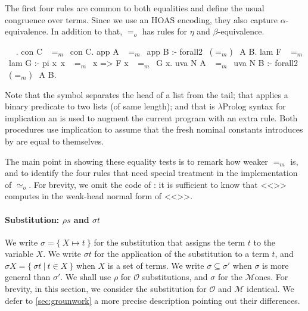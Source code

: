 \documentclass[sigconf,natbib=false,review]{acmart}
\newcommand{\EqualRel}{\ensuremath{=}}
\newcommand{\UnifRel}{\ensuremath{\simeq}}
\newcommand{\Uo}{\texorpdfstring{\ensuremath{\UnifRel_o}\xspace}{unif\_o}}
\newcommand{\Eo}{\ensuremath{\EqualRel_o}\xspace}
\newcommand{\Ee}{\ensuremath{\EqualRel_m}\xspace}
\newcommand{\Fo}{\texorpdfstring{\ensuremath{\mathcal{O}\xspace}}{O}} %
\newcommand{\Ho}{\texorpdfstring{\ensuremath{\mathcal{M}}\xspace}{M}}
\begin{document}
The first four rules are common to both equalities
and define the usual congruence over terms. Since
we use an HOAS encoding, they also capture $\alpha$-equivalence.
In addition to that, \Eo has rules for $\eta$ and $\beta$-equivalence.



\begin{elpicode}
  ~ \PYG{n+nf}{(\Ee)} ~.
  con C ~\Ee~con C.
  app A ~\Ee~app B :- forall2 ~(\Ee)~ A B.
  lam F ~\Ee~lam G :- pi x\ x ~\Ee~x => F x ~\Ee~G x.
  uva N A ~\Ee~uva N B :- forall2 ~(\Ee)~ A B.
\end{elpicode}

\noindent
Note that the symbol \elpiIn{|} separates the head of a list from the tail;
that  applies a binary predicate to two lists (of same
length); and that \elpiIn{=>} is $\lambda$Prolog syntax for
implication an is used to augment the
current program with an extra rule. Both procedures use implication to
assume that the fresh nominal constants introduces by  are
equal to themselves.

The main point in showing these equality tests is to remark how
weaker \Ee is, and to identify the four rules that need special
treatment in the implementation of \Uo.
For brevity, we omit the code of :
it is sufficient to know that <<>> computes in  the
weak-head normal form of <<>>.

\paragraph{Substitution: $\rho s$ and $\sigma t$}

We write $\sigma = \{~ X \mapsto t ~\}$ for the substitution that assigns
the term $t$ to the variable $X$.
We write $\sigma t$ for the application of
the substitution to a term $t$, and $\sigma X = \{~ \sigma t ~|~ t \in X ~\}$ when
$X$ is a set of terms.
We write $\sigma \subseteq \sigma'$ when $\sigma$ is more
general than $\sigma'$.
We shall use $\rho$ for \Fo{} substitutions,
and $\sigma$ for the \Ho ones.
For brevity, in this section, we consider
the substitution for \Fo{} and \Ho{} identical.
We defer to \cref{sec:grounwork} a more precise description
pointing out their differences.
\end{document}
